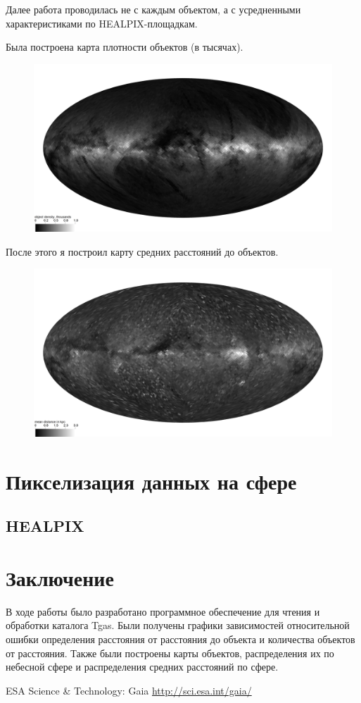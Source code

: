 \documentclass[14pt]{article} %
\begin{document}
Далее работа проводилась не с каждым объектом, а с усредненными характеристиками по HEALPIX-площадкам.

Была построена карта плотности объектов (в тысячах).
\begin{figure}[h!]
\includegraphics[width=1\linewidth]{healpdens.jpg}
\end{figure}\newpage

После этого я построил карту средних расстояний до объектов.
\begin{figure}[h!]
\includegraphics[width=1\linewidth]{healpdistmap.jpg}
\end{figure}

\section{Пикселизация данных на сфере}

\subsection{HEALPIX}

\section{Заключение}
В ходе работы было разработано программное обеспечение для чтения и обработки каталога Tgas. Были получены графики зависимостей относительной ошибки определения расстояния от расстояния до объекта и количества объектов от расстояния. Также были построены карты объектов, распределения их по небесной сфере и распределения средних расстояний по сфере.
\newpage
\begin{thebibliography}{99}
ESA Science \& Technology: Gaia \url{http://sci.esa.int/gaia/}
\end{thebibliography}
\end{document}

